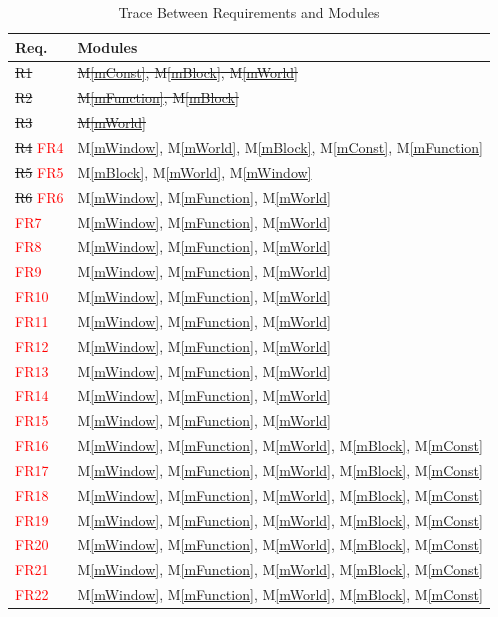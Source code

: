 \documentclass[12pt, titlepage]{article}
\newcommand{\mref}[1]{M\ref{#1}}
\begin{document}
\begin{table}[H]
\centering
\begin{tabular}{p{} p{}}
\toprule
\textbf{Req.} & \textbf{Modules}\\
\midrule
\sout{R1} & \sout{\mref{mConst}, \mref{mBlock}, \mref{mWorld}}\\
\sout{R2} & \sout{\mref{mFunction}, \mref{mBlock}}\\
\sout{R3} & \sout{\mref{mWorld}}\\
\sout{R4} \textcolor{red}{FR4} & \mref{mWindow}, \mref{mWorld}, \mref{mBlock}, \mref{mConst}, \mref{mFunction}\\
\sout{R5} \textcolor{red}{FR5} & \mref{mBlock}, \mref{mWorld}, \mref{mWindow}\\
\sout{R6} \textcolor{red}{FR6} & \mref{mWindow}, \mref{mFunction}, \mref{mWorld} \\
\textcolor{red}{FR7} & \mref{mWindow}, \mref{mFunction}, \mref{mWorld} \\
\textcolor{red}{FR8} & \mref{mWindow}, \mref{mFunction}, \mref{mWorld} \\
\textcolor{red}{FR9} & \mref{mWindow}, \mref{mFunction}, \mref{mWorld} \\
\textcolor{red}{FR10} & \mref{mWindow}, \mref{mFunction}, \mref{mWorld} \\
\textcolor{red}{FR11} & \mref{mWindow}, \mref{mFunction}, \mref{mWorld} \\
\textcolor{red}{FR12} & \mref{mWindow}, \mref{mFunction}, \mref{mWorld} \\
\textcolor{red}{FR13} & \mref{mWindow}, \mref{mFunction}, \mref{mWorld} \\
\textcolor{red}{FR14} & \mref{mWindow}, \mref{mFunction}, \mref{mWorld} \\
\textcolor{red}{FR15} & \mref{mWindow}, \mref{mFunction}, \mref{mWorld} \\
\textcolor{red}{FR16} & \mref{mWindow}, \mref{mFunction}, \mref{mWorld}, \mref{mBlock}, \mref{mConst} \\
\textcolor{red}{FR17} & \mref{mWindow}, \mref{mFunction}, \mref{mWorld}, \mref{mBlock}, \mref{mConst} \\
\textcolor{red}{FR18} & \mref{mWindow}, \mref{mFunction}, \mref{mWorld}, \mref{mBlock}, \mref{mConst} \\
\textcolor{red}{FR19} & \mref{mWindow}, \mref{mFunction}, \mref{mWorld}, \mref{mBlock}, \mref{mConst} \\
\textcolor{red}{FR20} & \mref{mWindow}, \mref{mFunction}, \mref{mWorld}, \mref{mBlock}, \mref{mConst} \\
\textcolor{red}{FR21} & \mref{mWindow}, \mref{mFunction}, \mref{mWorld}, \mref{mBlock}, \mref{mConst} \\
\textcolor{red}{FR22} & \mref{mWindow}, \mref{mFunction}, \mref{mWorld}, \mref{mBlock}, \mref{mConst} \\
\bottomrule
\end{tabular}
\caption{Trace Between Requirements and Modules}
\label{TblRT}
\end{table}
\end{document}
